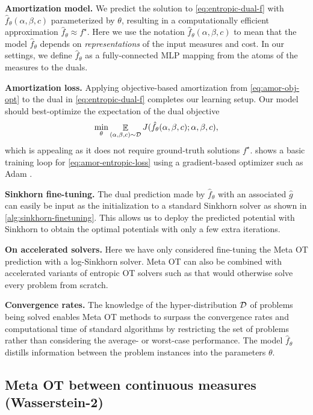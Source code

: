 \documentclass{article}
\begin{document}
\textbf{Amortization model.}
We predict the solution to \cref{eq:entropic-dual-f} with
$\hat f_\theta(\alpha, \beta, c)$ parameterized by $\theta$, resulting in
a computationally efficient approximation $\hat f_\theta \approx f^\star$.
Here we use the notation $\hat f_\theta(\alpha,\beta,c)$ to mean that
the model $\hat f_\theta$ depends on \emph{representations} of
the input measures and cost.
In our settings, we define $\hat f_\theta$ as a fully-connected MLP
mapping from the atoms of the measures to the duals.

\textbf{Amortization loss.}
Applying objective-based amortization from \cref{eq:amor-obj-opt} to
the dual in \cref{eq:entropic-dual-f} completes our
learning setup. Our model should best-optimize the expectation of the dual objective
\begin{equation}
  \min_\theta \mathop{\mathbb{E}}_{(\alpha,\beta,c)\sim{\mathcal{D}}} J(\hat f_\theta(\alpha, \beta, c); \alpha, \beta, c),
  \label{eq:amor-entropic-loss}
\end{equation}
which is appealing as it does not require ground-truth solutions $f^\star$.
 shows a basic training loop for
\cref{eq:amor-entropic-loss} using a gradient-based
optimizer such as Adam \citep{kingma2014adam}.

\textbf{Sinkhorn fine-tuning.}
The dual prediction made by $\hat f_\theta$ with an associated $\hat g$
can easily be input as the initialization to a standard Sinkhorn solver
as shown in \cref{alg:sinkhorn-finetuning}.
This allows us to deploy the predicted potential with
Sinkhorn to obtain the optimal potentials with
only a few extra iterations.

\textbf{On accelerated solvers.}
Here we have only considered fine-tuning the Meta OT prediction
with a log-Sinkhorn solver.
Meta OT can also be combined with accelerated variants of
entropic OT solvers such as
\citet{thibault2017overrelaxed,altschuler2017near,alaya2019screening,lin2019acceleration}
that would otherwise solve every problem from scratch.


\textbf{Convergence rates.}
The knowledge of the hyper-distribution ${\mathcal{D}}$ of problems
being solved enables Meta OT methods to surpass the
convergence rates and computational time of standard algorithms
by restricting the set of problems rather than considering
the average- or worst-case performance.
The model $\hat f_\theta$ distills information between the
problem instances into the parameters $\theta$.

\subsection{Meta OT between continuous measures (Wasserstein-2)}
\label{sec:meta-ot:icnn}
\begin{figure}[t]

\end{figure}
\end{document}
